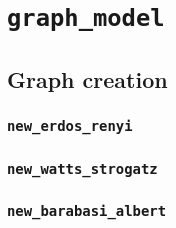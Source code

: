 \section{\texttt{graph\_model}}

\subsection{Graph creation}
\subsubsection{\texttt{new\_erdos\_renyi}}
\subsubsection{\texttt{new\_watts\_strogatz}}
\subsubsection{\texttt{new\_barabasi\_albert}}

